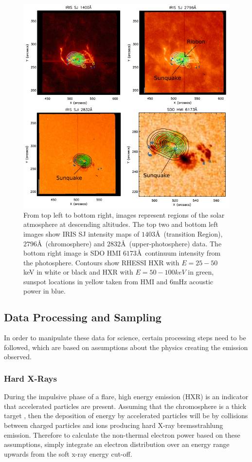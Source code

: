 \begin{figure}[H]
  \begin{center}
  \includegraphics[width=1.0\textwidth]{saxcontours-square}
  \end{center}
  \caption{From top left to bottom right, images represent regions of the solar atmosphere at descending altitudes. The top two and bottom left images show IRIS SJ intensity maps of $1403$\AA\ (transition Region), $2796$\AA\ (chromosphere) and $2832$\AA\ (upper-photosphere) data. The bottom right image is SDO HMI $6173$\AA\ continuum intensity from the photosphere. Contours show RHESSI HXR with $E = 25-50$ keV in white or black and HXR with $E = 50-100 keV$ in green, sunspot locations in yellow taken from HMI and 6mHz acoustic power in blue.}\label{saxcontours-vert}
\end{figure}


\subsection{Data Processing and Sampling}
In order to manipulate these data for science, certain processing steps need to be followed, which are based on assumptions about the physics creating the emission observed. 

\subsubsection{Hard X-Rays} 
During the impulsive phase of a flare, high energy emission (HXR) is an indicator that accelerated particles are present. Assuming that the chromosphere is a thick target \citep{1971SoPh...18..489B}, then the deposition of energy by accelerated particles will be by collisions between charged particles and ions producing hard X-ray bremsstrahlung emission. Therefore to calculate the non-thermal electron power based on these assumptions, simply integrate an electron distribution over an energy range upwards from the soft x-ray energy cut-off.
 
